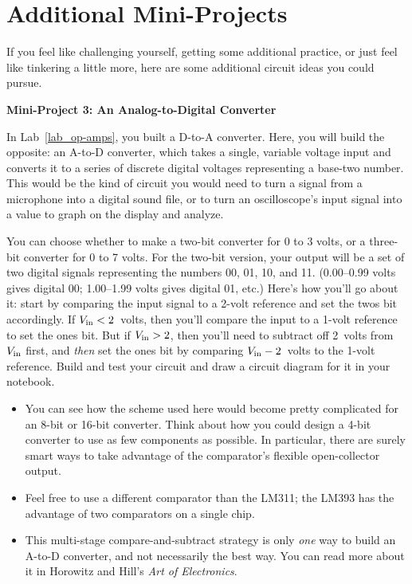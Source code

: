 \section{Additional Mini-Projects}
\label{extra_mini_projects}

If you feel like challenging yourself, getting some additional practice, or just feel like tinkering a little more, here are some additional circuit ideas you could pursue.

\bigskip
\textbf{Mini-Project 3: An Analog-to-Digital Converter}

In Lab~\ref{lab_op-amps}, you built a D-to-A converter.  Here, you will build the opposite: an A-to-D converter, which takes a single, variable voltage input and converts it to a series of discrete digital voltages representing a base-two number.  This would be the kind of circuit you would need to turn a signal from a microphone into a digital sound file, or to turn an oscilloscope's input signal into a value to graph on the display and analyze.

You can choose whether to make a two-bit converter for 0 to 3 volts, or a three-bit converter for 0 to 7 volts.  
For the two-bit version, your output will be a set of two digital signals representing the numbers 00, 01, 10, and 11.  (0.00--0.99 volts gives digital 00; 1.00--1.99 volts gives digital 01, etc.)  Here's how you'll go about it: start by comparing the input signal to a 2-volt reference and set the twos bit accordingly.  If $V_{\rm in}<2$~volts, then you'll compare the input to a 1-volt reference to set the ones bit.  
But if $V_{\rm in}>2$, then you'll need to subtract off 2~volts from $V_{\rm in}$ first, and \textit{then} set the ones bit by comparing $V_{\rm in}-2$~volts to the 1-volt reference.  Build and test your circuit and draw a circuit diagram for it in your notebook.

\begin{itemize}
\item You can see how the scheme used here would become pretty complicated for an 8-bit or 16-bit converter.  Think about how you could design a 4-bit converter to use as few components as possible.  In particular, there are surely smart ways to take advantage of the comparator's flexible open-collector output.

\item Feel free to use a different comparator than the LM311; the LM393 has the advantage of two comparators on a single chip. 

\item This multi-stage compare-and-subtract strategy is only \textit{one} way to build an A-to-D converter, and not necessarily the best way.  You can read more about it in Horowitz and Hill's \textit{Art of Electronics}.
\end{itemize}

